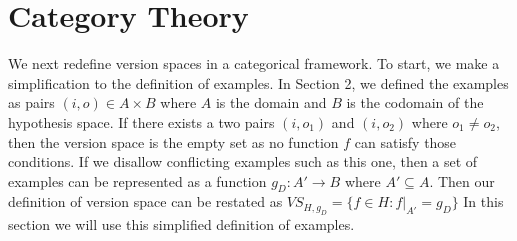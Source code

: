 \documentclass{article}
\theoremstyle{definition}
\begin{document}
\section{Category Theory}
We next redefine version spaces in a categorical framework. To start, we make a simplification to the definition of examples. In Section 2, we defined the examples as pairs $(i, o) \in A\times B$ where $A$ is the domain and $B$ is the codomain of the hypothesis space. If there exists a two pairs $(i, o_1)$ and $(i, o_2)$ where $o_1\neq o_2$, then the version space is the empty set as no function $f$ can satisfy those conditions. If we disallow conflicting examples such as this one, then a set of examples can be represented as a function $g_D : A' \rightarrow B$ where $A' \subseteq A$. Then our definition of version space can be restated as $VS_{H,g_D} = \{f \in H : f|_{A'} = g_D\}$ In this section we will use this simplified definition of examples.
\end{document}
